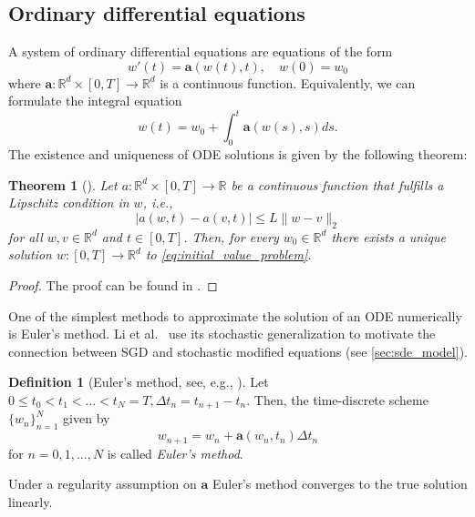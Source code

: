 \documentclass[12pt]{article}
\newtheorem{theorem}{Theorem}[section]
\theoremstyle{definition}
\newtheorem{definition}[definition]{Definition}
\numberwithin{equation}{section}
\newcommand{\R}{\mathbb{R}}
\newcommand{\norm}[1]{\lVert{#1}\rVert_2}
\begin{document}
\subsection{Ordinary differential equations}
A system of ordinary differential equations are equations of the form
\begin{equation}
  \label{eq:initial_value_problem}
  w'(t) = \mathbf{a}(w(t),t), \quad w(0) = w_0
\end{equation}
where $\mathbf{a} : \R^d \times [0,T] \rightarrow \R^d$ is a continuous function. Equivalently, we can formulate the integral equation
\begin{equation}
  w(t) = w_0 + \int_0^t \mathbf{a}(w(s),s)ds.
\end{equation}
The existence and uniqueness of ODE solutions is given by the following theorem:
\begin{theorem}[]
  \label{thm:ode_existence}
  Let $a : \R^d \times [0,T] \rightarrow \R$ be a continuous function that fulfills a Lipschitz condition in $w$, i.e.,
  \begin{equation*}
    \lvert a(w,t) - a(v,t) \rvert \leq L \norm{w - v}
  \end{equation*}
  for all $w,v \in \R^d$ and $t \in [0,T]$. Then, for every $w_0 \in \R^d$ there exists a unique solution $w:[0,T] \rightarrow \R^d$ to \eqref{eq:initial_value_problem}.
\end{theorem}
\begin{proof}
  The proof can be found in .
\end{proof}
One of the simplest methods to approximate the solution of an ODE numerically is Euler's method. Li et al.\ \cite{liStochasticModifiedEquations2019} use its stochastic generalization to motivate the connection between SGD and stochastic modified equations (see \autoref{sec:sde_model}).
\begin{definition}[Euler's method, see, e.g., ]
  Let $0 \leq t_0 < t_1 < \dots < t_N = T, \Delta t_n = t_{n+1} - t_n$. Then, the time-discrete scheme $\{w_n\}_{n=1}^N$ given by
  \begin{equation}
    \label{eq:ode_euler}
    w_{n+1} = w_n + \mathbf{a}(w_n, t_n) \Delta t_n
  \end{equation}
  for $n=0,1,\dots,N$ is called \emph{Euler's method}.
\end{definition}
Under a regularity assumption on $\mathbf{a}$ Euler's method converges to the true solution linearly.
\end{document}

